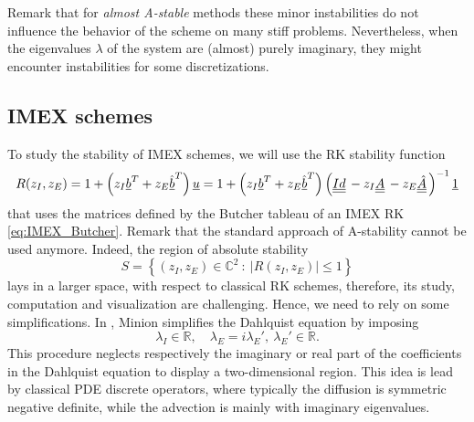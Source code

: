 Remark that for \textit{almost A-stable} methods these minor instabilities do not influence the behavior of the scheme on many stiff problems. Nevertheless, when the eigenvalues $\lambda$ of the system are (almost) purely imaginary, they might encounter instabilities for some discretizations.

\subsection{IMEX schemes}
To study the stability of IMEX schemes, we will use the RK stability function 
\begin{equation}\label{eq:ImExStabilityFunction}
R(z_I, z_E)=1+\left(z_I\vec{b}^T+z_E\vec{\hat{b}}^T\right)\vec{u}=1+\left(z_I\vec{b}^T+z_E\vec{\hat{b}}^T\right)\left(\mat{Id}-z_I\mat{A}-z_E\mat{\hat{A}}\right)^{-1} \vec{1}
\end{equation}
that uses the matrices defined by the Butcher tableau of an IMEX RK \eqref{eq:IMEX_Butcher}.
Remark that the standard approach of A-stability cannot be used anymore.
Indeed, the region of absolute stability $$S=\left\{(z_I,z_E)\in \mathbb{C}^2 \ : \ \lvert{R(z_I,z_E)}\rvert\le1\right\}$$ lays in a larger space, with respect to classical RK schemes, therefore, its study, computation and visualization are challenging.
Hence, we need to rely on some simplifications.
In \cite{minion2003dec}, Minion simplifies the Dahlquist equation by imposing
\begin{equation*}
\lambda_I \in \mathbb{R}, \quad \lambda_E =i\lambda_E', \ \lambda_E' \in \mathbb{R}.
\end{equation*} 
This procedure neglects respectively the imaginary or real part of the coefficients in the Dahlquist equation to display a two-dimensional region. This idea is lead by classical PDE discrete operators, where typically the diffusion is symmetric negative definite, while the advection is mainly with imaginary eigenvalues. 
